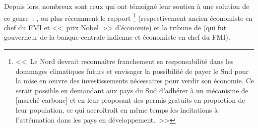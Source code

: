 \documentclass[a5paper,french,openany]{memoir}
\begin{document}
Depuis lors, nombreux sont ceux qui ont témoigné leur soutien à une solution de ce genre~: \citet{bertram_tradeable_1992,baer_equity_2000,jamieson_climate_2001}, ou plus récemment le rapport \citet{blanchard_major_2021}\footnote{<<~Le Nord devrait
reconnaître franchement sa responsabilité dans les dommages climatiques futurs et
envisager la possibilité de payer le Sud pour la mise en œuvre des investissements
nécessaires pour verdir son économie. Ce serait possible en demandant aux pays du Sud
d'adhérer à un mécanisme de [marché carbone] et en leur proposant des permis gratuits en proportion de leur population, ce qui accroîtrait en même temps les incitations à l'atténuation dans les pays en développement.~>>
} (respectivement ancien économiste en chef du FMI et <<~prix Nobel~>> d'économie) et la tribune de \citet{rajan_global_2021} (qui fut gouverneur de la banque centrale indienne et économiste en chef du FMI). 
\end{document}
